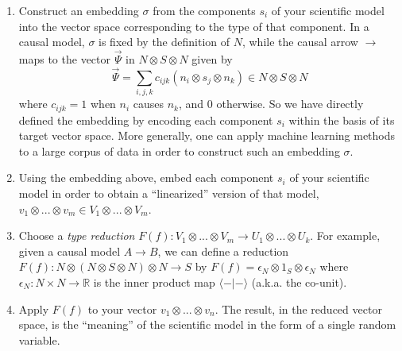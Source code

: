 \documentclass{article}
\theoremstyle{definition}
\begin{document}
\begin{enumerate}
\item Construct an embedding $\sigma$ from the components $s_i$ of your scientific model into the vector space corresponding to the type of that component. In a causal model, $\sigma$ is fixed by the definition of $N$, while the causal arrow $\to$ maps to the vector $\vec \Psi$ in $N \otimes S \otimes N$ given by 
\[ \vec \Psi = \sum_{i,j,k} c_{ijk} (n_i \otimes s_j \otimes n_k) \in N \otimes S \otimes N \]
where $c_{ijk} = 1$ when $n_i$ causes $n_k$, and 0 otherwise. So we have directly defined the embedding by encoding each component $s_i$ within the basis of its target vector space. More generally, one can apply machine learning methods to a large corpus of data in order to construct such an embedding $\sigma$.
\item Using the embedding above, embed each component $s_i$ of your scientific model in order to obtain a ``linearized'' version of that model, $v_1 \otimes ... \otimes v_m \in V_1 \otimes ... \otimes V_m$.



\item Choose a \emph{type reduction} $F(f) : V_1 \otimes ... \otimes V_m \to U_1 \otimes ... \otimes U_k$. 
For example, given a causal model $A \to B$, we can define a reduction $F(f) : N \otimes (N \otimes S \otimes N) \otimes N \to S$ by $F(f) = \epsilon_N \otimes 1_S \otimes \epsilon_N$ where $\epsilon_N : N \times N \to \mathbb{R}$ is the inner product map $\langle - | - \rangle$ (a.k.a. the co-unit).

\item Apply $F(f)$ to your vector $v_1 \otimes ... \otimes v_n$. The result, in the reduced vector space, is the ``meaning'' of the scientific model in the form of a single random variable.
\end{enumerate}
\end{document}
